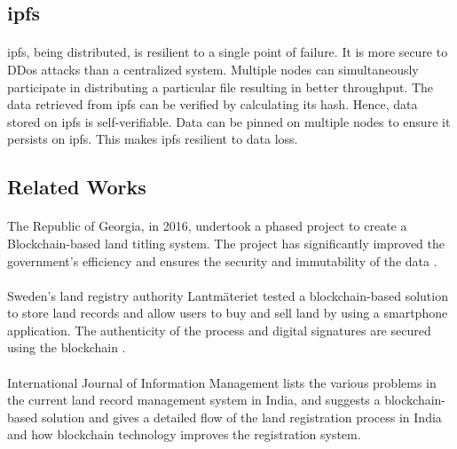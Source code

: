\documentclass[12pt]{article}
\begin{document}
    \subsection{\acrshort{ipfs}}
        \paragraph{}
        \acrshort{ipfs}, being distributed, is resilient to a single point of failure. It is more secure to DDos attacks than a centralized system. Multiple nodes can simultaneously participate in distributing a particular file resulting in better throughput. The data retrieved from \acrshort{ipfs} can be verified by calculating its hash. Hence, data stored on \acrshort{ipfs} is self-verifiable. Data can be pinned on multiple nodes to ensure it persists on \acrshort{ipfs}. This makes \acrshort{ipfs} resilient to data loss.

    \subsection{Related Works}
        \paragraph{}
        The Republic of Georgia, in 2016, undertook a phased project to create a Blockchain-based land titling system. The project has significantly improved the government’s efficiency and ensures the security and immutability of the data \cite{10.1162/inov_a_00276}.

        \paragraph{}
        Sweden’s land registry authority Lantmäteriet tested a blockchain-based solution to store land records and allow users to buy and sell land by using a smartphone application. The authenticity of the process and digital signatures are secured using the blockchain \cite{sweden}.
        
        \paragraph{}
        International Journal of Information Management \cite{THAKUR2020101940} lists the various problems in the current land record management system in India, and suggests a blockchain-based solution and gives a detailed flow of the land registration process in India and how blockchain technology improves the registration system.
\end{document}
